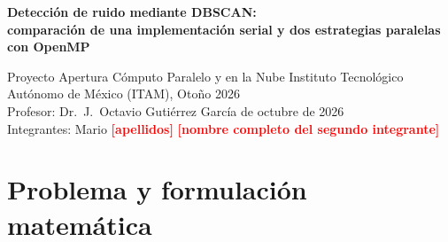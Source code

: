 \documentclass[11pt,letterpaper]{article}
\newcommand{\code}[1]{\texttt{#1}}
\newcommand{\pendiente}[1]{\textcolor{red}{\textbf{[#1]}}}
\begin{document}
\begin{center}
{\Large\bfseries Detección de ruido mediante DBSCAN:\\[1pt]
comparación de una implementación serial y dos estrategias paralelas con OpenMP\par}
\vspace{0.5em}
{\small Proyecto Apertura \textperiodcentered{} Cómputo Paralelo y en la Nube \textperiodcentered{}
Instituto Tecnológico Autónomo de México (ITAM), Otoño 2026\\
Profesor: Dr.\ J.\ Octavio Gutiérrez García \quad\textperiodcentered{} de octubre de 2026\\
Integrantes: Mario \pendiente{apellidos} \quad\textperiodcentered\quad \pendiente{nombre completo del segundo
integrante}\par}
\end{center}

\begin{abstract}
\noindent Implementamos en C++ el detector de ruido de dos pasos basado en DBSCAN visto en clase
($\varepsilon=0.03$, \code{min\_samples}~$=10$) en tres versiones: una serial de búsqueda exhaustiva; P1, que
reparte los puntos entre hilos de OpenMP; y P2, que divide el plano en $k$ regiones con halos de ancho
$\varepsilon$. Evaluamos 2,320 ejecuciones (ocho tamaños de 20,000 a 200,000 puntos; 1, 6, 12 y 24 hilos;
$k$ de 2 a 64; diez repeticiones) en un Apple M4 Pro de 12 núcleos. Todas reprodujeron exactamente las clases y
los conteos de vecinos de la versión serial. Con 200,000 puntos y 12 hilos, P1 fue 8.29 veces más rápido que la
versión serial y P2 con $k=64$, 47.77 veces. La ventaja de P2 combina una ganancia algorítmica de 7.83, por
evaluar menos pares, con una ganancia paralela de 6.10; con $k\le 4$, en cambio, P2 fue más lento que P1.
\end{abstract}

\section{Problema y formulación matemática}\label{sec:problema}
\end{document}
